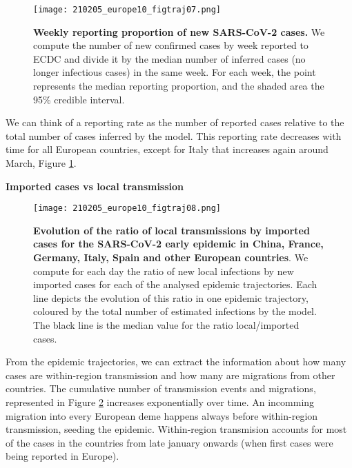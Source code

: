 \begin{figure}[ht]
    \centering
    \texttt{[image: 210205\_europe10\_figtraj07.png]}
    \caption{\textbf{Weekly reporting proportion of new SARS-CoV-2 cases.} We compute the number of new confirmed cases by week reported to ECDC and divide it by the median number of inferred cases (no longer infectious cases) in the same week. For each week, the point represents the median reporting proportion, and the shaded area the 95\% credible interval.}
    \label{fig:reported}
\end{figure}


We can think of a reporting rate as the number of reported cases relative to the total number of cases inferred by the model. This reporting rate decreases with time for all European countries, except for Italy that increases again around March, Figure \ref{fig:reported}. 




\textbf{Imported cases vs local transmission}

\begin{figure}[ht]
    \centering
    \texttt{[image: 210205\_europe10\_figtraj08.png]}
    \caption{\textbf{Evolution of the ratio of local transmissions by imported cases for the SARS-CoV-2 early epidemic in China, France, Germany, Italy, Spain and other European countries}. We compute for each day the ratio of new local infections by new imported cases for each of the analysed epidemic trajectories. Each line depicts the evolution of this ratio in one epidemic trajectory, coloured by the total number of estimated infections by the model. The black line is the median value for the ratio local/imported cases.}
    \label{fig:events}
\end{figure}



From the epidemic trajectories, we can extract the information about how many cases are within-region transmission and how many are migrations from other countries. The cumulative number of transmission events and migrations, represented in Figure \ref{fig:events} increases exponentially over time. An incomming migration into every European deme happens always before within-region transmission, seeding the epidemic. Within-region transmision accounts for most of the cases in the countries from late january onwards (when first cases were being reported in Europe).




